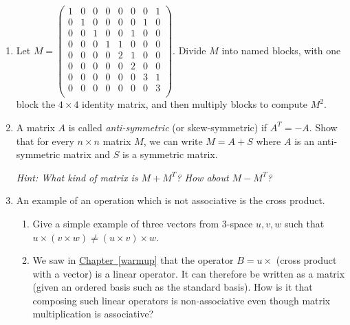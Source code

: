 \begin{enumerate}




\item Let $M = \begin{pmatrix}
1 & 0 & 0 & 0 & 0 & 0 & 0 & 1 \\
0 & 1 & 0 & 0 & 0 & 0 & 1 & 0 \\
0 & 0 & 1 & 0 & 0 & 1 & 0 & 0 \\
0 & 0 & 0 & 1 & 1 & 0 & 0 & 0 \\
0 & 0 & 0 & 0 & 2 & 1 & 0 & 0 \\
0 & 0 & 0 & 0 & 0 & 2 & 0 & 0 \\
0 & 0 & 0 & 0 & 0 & 0 & 3 & 1 \\
0 & 0 & 0 & 0 & 0 & 0 & 0 & 3 \\
\end{pmatrix}$.  Divide $M$ into named blocks, with one block the $4\times4$ identity matrix, and then multiply blocks to compute $M^2$.


\item A matrix $A$ is called \emph{anti-symmetric} (or skew-symmetric) if $A^T = -A$. Show that for every $n \times n$ matrix $M$, we can write $M = A + S$ where $A$ is an anti-symmetric matrix and $S$ is a symmetric matrix.

\emph{Hint: What kind of matrix is $M + M^T$? How about $M - M^T$?}

\item An example of an operation which is not associative is the cross product. 
\begin{enumerate}
\item Give a simple example of three vectors from 3-space $u,v,w$ such that $u\times (v\times w) \neq (u\times v)\times w$. 
\item We saw in \hyperlink{crossmat}{Chapter~\ref{warmup}} that the operator $B=u\times$ (cross product with a vector) is a linear operator. It can therefore be written as a matrix (given an ordered basis such as the standard basis). How is it that composing such linear operators is non-associative even though matrix multiplication is associative? 


\end{enumerate}
\end{enumerate}
